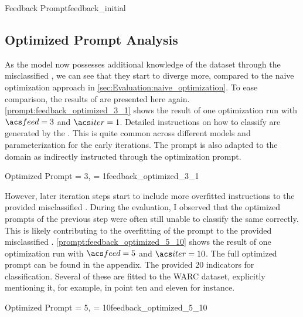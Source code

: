 \begin{prompt}{Feedback Prompt}{feedback_initial}
    \\
    
\end{prompt}

\subsection{Optimized Prompt Analysis}
\label{subsec:Evaluation:simple_feedback:optimized-prompt-analysis}

As the model now possesses additional knowledge of the dataset through the misclassified \TLs, we can see that they start to diverge more, compared to the naive optimization approach in \autoref{sec:Evaluation:naive_optimization}.
To ease comparison, the results of \gpt are presented here again.
\autoref{prompt:feedback_optimized_3_1} shows the result of one optimization run with $\feed=3$ and $\iter=1$.
Detailed instructions on how to classify \TLs are generated by the \LLM.
This is quite common across different models and parameterization for the early iterations.
The prompt is also adapted to the \RtR domain as indirectly instructed through the optimization prompt.

\begin{prompt}{Optimized Prompt \feed = 3, \iter = 1}{feedback_optimized_3_1}
    \\
    
\end{prompt}

However, later iteration steps start to include more overfitted instructions to the provided misclassified \TLs.
During the evaluation, I observed that the optimized prompts of the previous step were often still unable to classify the same \TLs correctly.
This is likely contributing to the overfitting of the prompt to the provided misclassified \TLs.
\autoref{prompt:feedback_optimized_5_10} shows the result of one optimization run with $\feed=5$ and $\iter=10$.
The full optimized prompt can be found in the appendix. 
The \LLM provided 20 indicators for classification.
Several of these are fitted to the WARC dataset, explicitly mentioning it, for example, in point ten and eleven for instance.

\begin{prompt}{Optimized Prompt \feed = 5, \iter = 10}{feedback_optimized_5_10}
    \\
    
\end{prompt}

